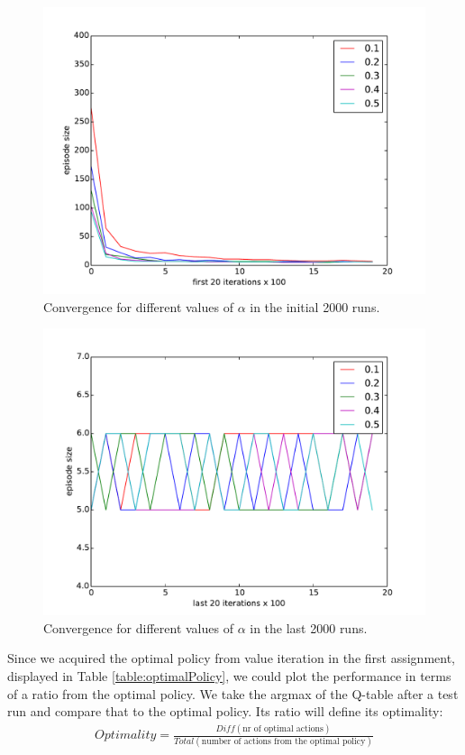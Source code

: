 \documentclass[paper=a4, fontsize=11pt]{scrartcl}
\numberwithin{equation}{section}		%
\numberwithin{figure}{section}			%
\numberwithin{table}{section}				%
\begin{document}
\begin{figure}[H] \centering
\includegraphics[scale=0.5]{alphafirst20x100.pdf}
\caption{Convergence for different values of $\alpha$ in the initial 2000 runs.} 
\label{figure:alphafirst20}
\end{figure}
\begin{figure}[H] \centering
\includegraphics[scale=0.5]{alphalast20x100.pdf}
\caption{Convergence for different values of $\alpha$ in the last 2000 runs.} 
\label{figure:alphalast20}
\end{figure}
Since we acquired the optimal policy from value iteration in the first assignment, displayed in Table \ref{table:optimalPolicy}, we could plot the performance in terms of a ratio from the optimal policy. We take the argmax of the Q-table after a test run and compare that to the optimal policy. Its ratio will define its optimality:
\begin{align}
Optimality = \frac{Diff(\text{nr of optimal actions})}{Total(\text{number of actions from the optimal policy})}
\end{align}
\end{document}
